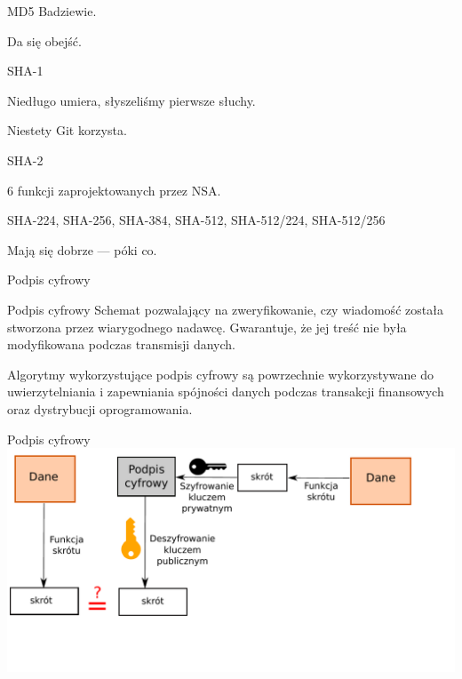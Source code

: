 \begin{frame}{MD5}
	Badziewie.
	
	Da się obejść.
\end{frame}

\begin{frame}{SHA-1}
	
	Niedługo umiera, słyszeliśmy pierwsze słuchy.
	
	Niestety Git korzysta.
	
\end{frame}

\begin{frame}{SHA-2}
	
	6 funkcji zaprojektowanych przez NSA.
	
	SHA-224, SHA-256, SHA-384, SHA-512, SHA-512/224, SHA-512/256
	
	Mają się dobrze --- póki co.
	
\end{frame}

\begin{frame}{Podpis cyfrowy}
	\begin{alertblock}{Podpis cyfrowy}
		Schemat pozwalający na zweryfikowanie, czy wiadomość została stworzona przez wiarygodnego nadawcę. Gwarantuje, że jej treść nie była modyfikowana podczas transmisji danych.
	\end{alertblock}	
	Algorytmy wykorzystujące podpis cyfrowy są powrzechnie wykorzystywane	 do uwierzytelniania i zapewniania spójności danych podczas transakcji finansowych oraz dystrybucji oprogramowania. 
\end{frame}

\begin{frame}{Podpis cyfrowy}
		\includegraphics[height=0.5\paperwidth]{images/dig-sign.pdf}
\end{frame}
